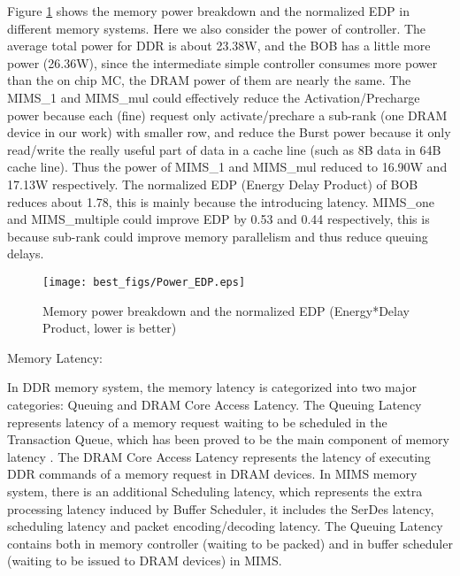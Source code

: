 \documentclass[pageno]{jpaper}
\begin{document}
Figure \ref{Memory_Power_EDP} shows the memory power breakdown and the normalized EDP in different memory systems. Here we also consider the power of controller. The average total power for DDR is about 23.38W, and the BOB has a little more power (26.36W), since the intermediate simple controller consumes more power than the on chip MC, the DRAM power of them are nearly the same. The MIMS\_1 and MIMS\_mul could effectively reduce the Activation/Precharge power because each (fine) request only activate/prechare a sub-rank (one DRAM device in our work) with smaller row, and reduce the Burst power because it only read/write the really useful part of data in a cache line (such as 8B data in 64B cache line). Thus the power of MIMS\_1 and MIMS\_mul reduced to 16.90W and 17.13W respectively. The normalized EDP (Energy Delay Product) of BOB reduces about 1.78, this is mainly because the introducing latency. MIMS\_one and MIMS\_multiple could improve EDP by 0.53 and 0.44 respectively, this is because sub-rank could improve memory parallelism and thus reduce queuing delays.

\begin{figure}
  \centering
  \texttt{[image: best\_figs/Power\_EDP.eps]}
  \caption{Memory power breakdown and the normalized EDP (Energy*Delay Product, lower is better)}
  \label{Memory_Power_EDP}
\end{figure}

\begin{bfseries}Memory Latency:\end{bfseries}In DDR memory system, the memory latency is categorized into two major categories: Queuing and DRAM Core Access Latency. The Queuing Latency represents latency of a memory request waiting to be scheduled in the Transaction Queue, which has been proved to be the main component of memory latency \cite{RethinkDRAMArch}. The DRAM Core Access Latency represents the latency of executing DDR commands of a memory request in DRAM devices. In MIMS memory system, there is an additional Scheduling latency, which represents the extra processing latency induced by Buffer Scheduler, it includes the SerDes latency, scheduling latency and packet encoding/decoding latency. The Queuing Latency contains both in memory controller (waiting to be packed) and in buffer scheduler (waiting to be issued to DRAM devices) in MIMS.
\end{document}
